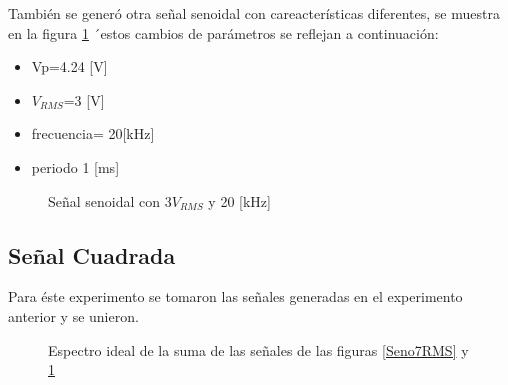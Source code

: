 \documentclass{article}
\begin{document}
También se generó otra señal senoidal con careacterísticas diferentes, se muestra en la figura \ref{Seno3RMS} ´estos cambios de parámetros se reflejan a continuación:\\

\begin{itemize}
    \item Vp=4.24 [V]
    \item $V_{RMS}$=3 [V]
    \item frecuencia= 20[kHz]
    \item periodo 1 [ms]
\end{itemize}


\begin{figure}[h!]
    \centering
    
   
\caption{Señal senoidal con $3 V_{RMS}$ y 20 [kHz]}
\label{Seno3RMS}
\end{figure}


\subsection{Señal Cuadrada}

Para éste experimento se tomaron las señales generadas en el experimento anterior y se unieron.



\begin{figure}[h!]
    \centering
    
   
\caption{Espectro ideal de la suma de las señales de las figuras \ref{Seno7RMS} y \ref{Seno3RMS}  }
\end{figure}
\end{document}
